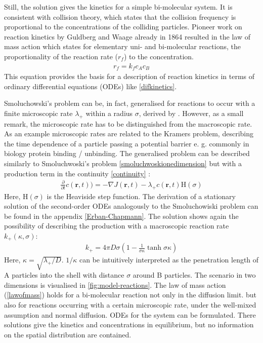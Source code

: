 \documentclass[
  a4paper,BCOR10mm,twoside,
  headsepline,footsepline,%
  fleqn,openbib
]{scrbook}
\begin{document}
Still, the solution gives the kinetics for a simple bi-molecular system. It is consistent with collision theory, which states that the collision frequency is proportional to the concentrations of the colliding particles. Pioneer work on reaction kinetics by Guldberg and Waage already in 1864 \cite{Waage1986} resulted in the law of mass action which states for elementary uni- and bi-molecular reactions, the proportionality of the reaction rate ($r_f$) to the concentration.
\begin{align} \label{lawofmass}
 r_f=k_f c_A c_B
\end{align}
This equation provides the basis for a description of reaction kinetics in terms of ordinary differential equations (ODEs) like \cref{difkinetics}.\par
Smoluchowski's problem can be, in fact, generalised for reactions to occur with a finite microscopic rate $\lambda_{+}$ within a radius $\sigma$, derived by \citet{Erban2009}.  However, as a small remark, the microscopic rate has to be distinguished from the macroscopic rate. As an example microscopic rates are related to the Kramers problem, describing the time dependence of a particle passing a potential barrier e. g. commonly in biology protein binding / unbinding. The generalised problem can be described similarly to Smoluchwoski's problem \cref{smoluchwoskionedimension} but with a production term in the continuity  \cref{continuity} :
\begin{align}
\frac{\partial}{\partial t} c(\bm{r},t))=- \nabla J(\bm{r},t)- \lambda_+ c(\bm{r},t) \mathrm{H}(\sigma)
\end{align}
Here, $\mathrm{H}(\sigma)$ is the Heaviside step function. The derivation of a  stationary solution of the second-order ODEs analogously to the Smoluchowiski problem can be found in the appendix \ref{Erban-Chapmann}. The solution shows again the possibility of describing the production with a macroscopic reaction rate $k_{+}(\kappa, \sigma)$:
\begin{align} \label{kalphaerbanchepmann}
k_{+}=4 \pi D \sigma \left( 1-\frac{1}{\sigma \kappa} \tanh{\sigma \kappa}\right)
\end{align}
Here, $\kappa=\sqrt{\lambda_+/D}$. $1/\kappa$ can be intuitively interpreted as the penetration length of A particles into the shell with distance $\sigma$ around B particles. The scenario in two dimensions is visualised in \cref{fig:model-reactions}. The law of mass action (\cref{lawofmass}) holds for a bi-molecular reaction not only in the diffusion limit. but also for reactions occurring with a certain microscopic rate, under the well-mixed assumption and normal diffusion.  ODEs for the system can be formulated. There solutions give the kinetics and concentrations in equilibrium, but no information on the spatial distribution are contained.
\end{document}
